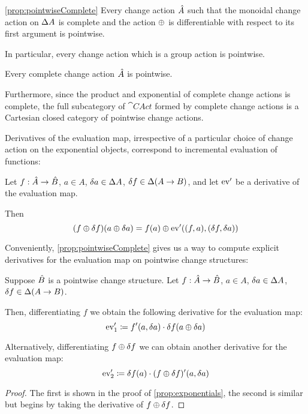 \begin{prop}
  \ref{prop:pointwiseComplete}
  Every change action $\hat{A}$ such that the monoidal change action
  on $\Delta A$ is complete and the action $\oplus$ is differentiable with
  respect to its first argument is pointwise.

  In particular, every change action which is a group action is pointwise.
\end{prop}

\begin{prop}
   Every complete change action $\hat{A}$ is pointwise.
\end{prop}
Furthermore, since the product and exponential of complete change actions is complete,
the full subcategory of $\cat{CAct}$ formed by complete change actions is a Cartesian
closed category of pointwise change actions.

Derivatives of the evaluation map, irrespective of a particular choice of change action on the
exponential objects, correspond to incremental evaluation of functions:
\begin{prop}[Incrementalization]
\label{prop:incrementalization}
  Let $f: \hat{A} \rightarrow \hat{B}$, $a \in A$, $\delta a \in
  \Delta A$, $\delta f \in \Delta (A \rightarrow B)$, and let
  $\operatorname{ev}'$ be a derivative of the evaluation map.

  Then
  \begin{displaymath}
    (f \oplus \delta f)(a \oplus \delta a) = f(a) \oplus \operatorname{ev}'((f, a), (\delta f, \delta a))
  \end{displaymath}
\end{prop}

Conveniently, \cref{prop:pointwiseComplete} gives us a way to compute explicit derivatives for
the evaluation map on pointwise change structures:
\begin{prop}
\label{prop:evDerivatives}
  Suppose $\hat{B}$ is a pointwise change structure. Let
  $f: \hat{A} \rightarrow \hat{B}$,
  $a \in A$, $\delta a \in \Delta A$,
  $\delta f \in \Delta (A \rightarrow B)$.

  Then, differentiating $f$ we obtain the following derivative for the evaluation map:
  \begin{displaymath}
    \operatorname{ev}'_1 \coloneqq f'(a, \delta a) \cdot \delta f(a \oplus \delta a)
  \end{displaymath}

  Alternatively, differentiating $f \oplus \delta f$ we can obtain another derivative
  for the evaluation map:
  \begin{displaymath}
    \operatorname{ev}'_2 \coloneqq \delta f(a) \cdot (f \oplus \delta f)'(a, \delta a)
  \end{displaymath}
\end{prop}
\ifproofs
\begin{proof}
  The first is shown in the proof of \cref{prop:exponentials}, the second is
  similar but begins by taking the derivative of $f \oplus \delta f$.
\end{proof}
\fi

